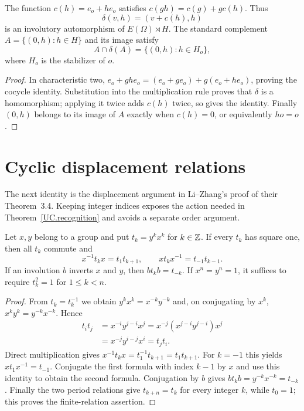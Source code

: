 \begin{lemma}\label{UC.twist}
The function $c(h)=e_o+he_o$ satisfies
$c(gh)=c(g)+gc(h)$. Thus
\[
 \delta(v,h)=(v+c(h),h)
\]
is an involutory automorphism of $E(\Omega)\rtimes H$. The standard
complement $A=\{(0,h):h\in H\}$ and its image satisfy
\[
 A\cap\delta(A)=\{(0,h):h\in H_o\},
\]
where $H_o$ is the stabilizer of $o$.
\end{lemma}
\begin{proof}
In characteristic two,
$e_o+ghe_o=(e_o+ge_o)+g(e_o+he_o)$, proving the cocycle identity.
Substitution into the multiplication rule proves that $\delta$ is a
homomorphism; applying it twice adds $c(h)$ twice, so gives the identity.
Finally $(0,h)$ belongs to its image of $A$ exactly when
$c(h)=0$, or equivalently $ho=o$.
\end{proof}

\section{Cyclic displacement relations}
The next identity is the displacement argument in Li--Zhang's proof of
their Theorem~3.4. Keeping integer indices exposes the action needed in
Theorem~\ref{UC.recognition} and avoids a separate order argument.

\begin{lemma}\label{UC.displacements}
Let $x,y$ belong to a group and put $t_k=y^kx^k$ for $k\in\mathbb Z$.
If every $t_k$ has square one, then all $t_k$ commute and
\[
 x^{-1}t_kx=t_1t_{k+1},\qquad
 xt_kx^{-1}=t_{-1}t_{k-1}.
\]
If an involution $b$ inverts $x$ and $y$, then $bt_kb=t_{-k}$.
If $x^n=y^n=1$, it suffices to require $t_k^2=1$ for
$1\le k<n$.
\end{lemma}
\begin{proof}
From $t_k=t_k^{-1}$ we obtain
$y^kx^k=x^{-k}y^{-k}$ and, on conjugating by $x^k$,
$x^ky^k=y^{-k}x^{-k}$. Hence
\[
 \begin{aligned}
 t_it_j
 &=x^{-i}y^{j-i}x^j
 =x^{-j}(x^{j-i}y^{j-i})x^j\\
 &=x^{-j}y^{i-j}x^i=t_jt_i.
 \end{aligned}
\]
Direct multiplication gives
$x^{-1}t_kx=t_1^{-1}t_{k+1}=t_1t_{k+1}$.
For $k=-1$ this yields $xt_1x^{-1}=t_{-1}$.
Conjugate the first formula with index $k-1$ by $x$ and use this
identity to obtain the second formula. Conjugation by $b$ gives
$bt_kb=y^{-k}x^{-k}=t_{-k}$. Finally the two period relations give
$t_{k+n}=t_k$ for every integer $k$, while $t_0=1$; this proves the
finite-relation assertion.
\end{proof}

